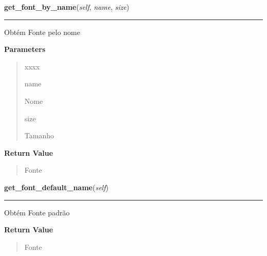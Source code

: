 \hspace{.8\funcindent}\begin{boxedminipage}{\funcwidth}

    \raggedright \textbf{get\_font\_by\_name}(\textit{self}, \textit{name}, \textit{size})

    \vspace{-1.5ex}

    \rule{\textwidth}{0.5\fboxrule}
\setlength{\parskip}{2ex}
    Obtém Fonte pelo nome

\setlength{\parskip}{1ex}
      \textbf{Parameters}
      \vspace{-1ex}

      \begin{quote}
        \begin{Ventry}{xxxx}

          \item[name]

          Nome

          \item[size]

          Tamanho

        \end{Ventry}

      \end{quote}

      \textbf{Return Value}
    \vspace{-1ex}

      \begin{quote}
      Fonte

      \end{quote}

    \end{boxedminipage}

    \label{pygame-asteroids:resource_manager:ResourceManager:get_font_default_name}

    \vspace{0.5ex}

\hspace{.8\funcindent}\begin{boxedminipage}{\funcwidth}

    \raggedright \textbf{get\_font\_default\_name}(\textit{self})

    \vspace{-1.5ex}

    \rule{\textwidth}{0.5\fboxrule}
\setlength{\parskip}{2ex}
    Obtém Fonte padrão

\setlength{\parskip}{1ex}
      \textbf{Return Value}
    \vspace{-1ex}

      \begin{quote}
      Fonte

      \end{quote}

    \end{boxedminipage}

